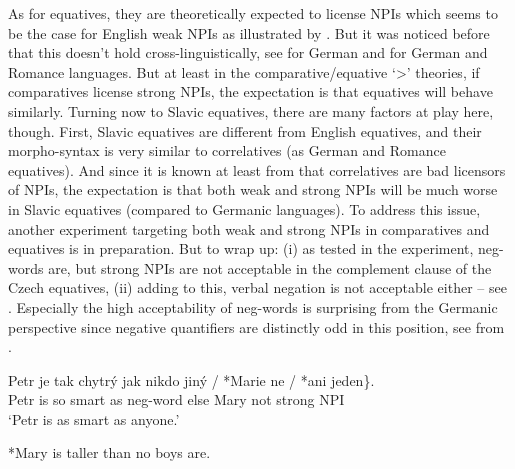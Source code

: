 As for equatives, they are theoretically expected to license NPIs which seems to be the case for English weak NPIs as illustrated by . But it was noticed before that this doesn't hold cross-linguistically, see \citet{krifka1992some} for German and \citet{penka2016degree} for German and Romance languages. But at least in the comparative/equative `>' theories, if comparatives license strong NPIs, the expectation is that equatives will behave similarly. Turning now to Slavic equatives, there are many factors at play here, though. First, Slavic equatives are different from English equatives, and their morpho-syntax is very similar to correlatives (as German and Romance equatives). And since it is known at least from \citet {pauline1995quantificational} that correlatives are bad licensors of NPIs, the expectation is that both weak and strong NPIs will be much worse in Slavic equatives (compared to Germanic languages). To address this issue, another experiment targeting both weak and strong NPIs in comparatives and equatives is in preparation. But to wrap up: (i) as tested in the experiment, neg-words are, but strong NPIs are not acceptable in the complement clause of the Czech equatives, (ii) adding to this, verbal negation is not acceptable either -- see . Especially the high acceptability of neg-words is surprising from the Germanic perspective since negative quantifiers are distinctly odd in this position, see  from \citet{gajewski2008more}.

  
\ea\label{ex-20} \gll Petr je tak chytrý jak \minsp{\{} nikdo jiný / *Marie ne / *ani jeden\}.\\
Petr is so smart as {} neg-word else {} Mary not {} strong NPI\\
\glt `Petr is as smart as anyone.'
\z  

\ea\label{ex-21} *Mary is taller than no boys are.
\z
  
